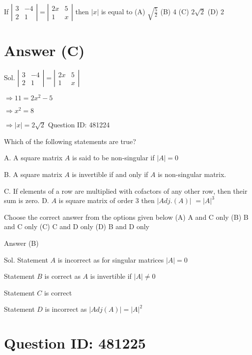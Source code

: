 If $\left|\begin{array}{cc}3 & -4 \\ 2 & 1\end{array}\right|=\left|\begin{array}{cc}2 x & 5 \\ 1 & x\end{array}\right|$ then $|x|$ is equal to
(A) $\sqrt{\frac{5}{2}}$
(B) 4
(C) $2 \sqrt{2}$
(D) 2

\section*{Answer (C)}

Sol. $\left|\begin{array}{cc}3 & -4 \\ 2 & 1\end{array}\right|=\left|\begin{array}{cc}2 x & 5 \\ 1 & x\end{array}\right|$

$\Rightarrow 11=2 x^{2}-5$

$\Rightarrow x^{2}=8$

$\Rightarrow|x|=2 \sqrt{2}$
Question ID: 481224

Which of the following statements are true?

A. A square matrix $A$ is said to be non-singular if $|A|=0$

B. A square matrix $A$ is invertible if and only if $A$ is non-singular matrix.

C. If elements of a row are multiplied with cofactors of any other row, then their sum is zero.
D. $A$ is square matrix of order 3 then $|A d j .(A)|$ $=|A|^{3}$

Choose the correct answer from the options given below
(A) A and C only
(B) B and C only
(C) C and D only
(D) B and D only

Answer (B)

Sol. Statement $A$ is incorrect as for singular matrices $|A|=0$

Statement $B$ is correct as $A$ is invertible if $|A| \neq 0$

Statement $C$ is correct

Statement $D$ is incorrect as $|A d j(A)|=|A|^{2}$

\section*{Question ID: 481225}

